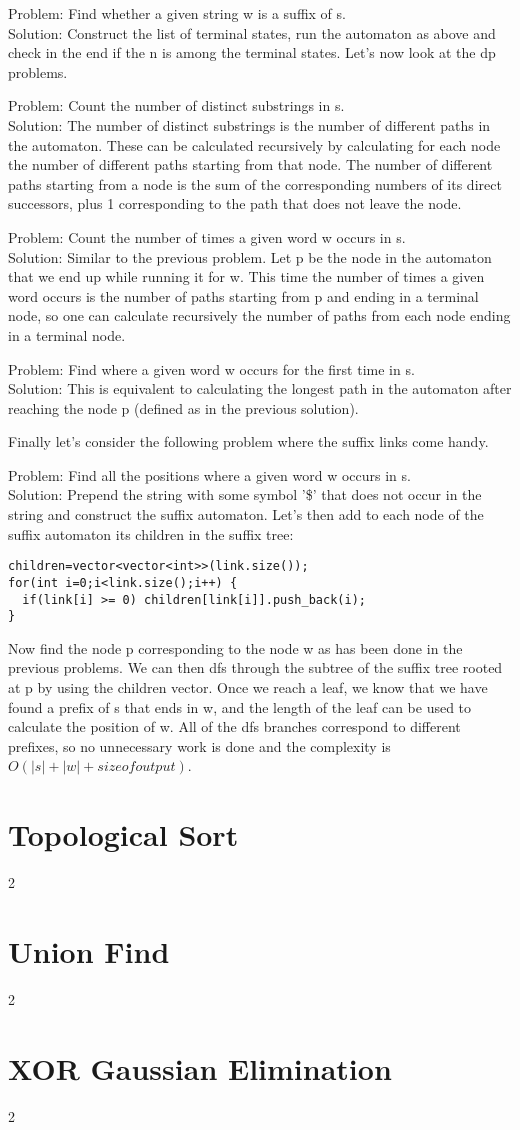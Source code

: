 \documentclass[a4paper,13pt]{article}
\newcommand\includefile[3]{
   \section{#1}
   \begin{multicols}{2}
    
   \end{multicols}
}
\begin{document}
Problem: Find whether a given string w is a suffix of s.\\
Solution: Construct the list of terminal states, run the automaton as above and check in the end if the n is among the terminal states.
Let's now look at the dp problems.

Problem: Count the number of distinct substrings in s.\\
Solution: The number of distinct substrings is the number of different paths in the automaton. These can be calculated recursively by calculating for each node the number of different paths starting from that node. The number of different paths starting from a node is the sum of the corresponding numbers of its direct successors, plus 1 corresponding to the path that does not leave the node.

Problem: Count the number of times a given word w occurs in s.\\
Solution: Similar to the previous problem. Let p be the node in the automaton that we end up while running it for w. This time the number of times a given word occurs is the number of paths starting from p and ending in a terminal node, so one can calculate recursively the number of paths from each node ending in a terminal node.

Problem: Find where a given word w occurs for the first time in s.\\
Solution: This is equivalent to calculating the longest path in the automaton after reaching the node p (defined as in the previous solution).

Finally let's consider the following problem where the suffix links come handy.

Problem: Find all the positions where a given word w occurs in s.\\
Solution: Prepend the string with some symbol '\$' that does not occur in the string and construct the suffix automaton. Let's then add to each node of the suffix automaton its children in the suffix tree:

\begin{verbatim}
children=vector<vector<int>>(link.size());
for(int i=0;i<link.size();i++) {
  if(link[i] >= 0) children[link[i]].push_back(i);
}
\end{verbatim}

Now find the node p corresponding to the node w as has been done in the previous problems. We can then dfs through the subtree of the suffix tree rooted at p by using the children vector. Once we reach a leaf, we know that we have found a prefix of s that ends in w, and the length of the leaf can be used to calculate the position of w. All of the dfs branches correspond to different prefixes, so no unnecessary work is done and the complexity is $O(|s| + |w| + size of output)$.

\includefile{Topological Sort}{../lib}{topological_sort.cpp}
\includefile{Union Find}{../lib}{union_find.cpp}
\includefile{XOR Gaussian Elimination}{../lib}{gaussian_elimination_xor.cpp}
\end{document}
